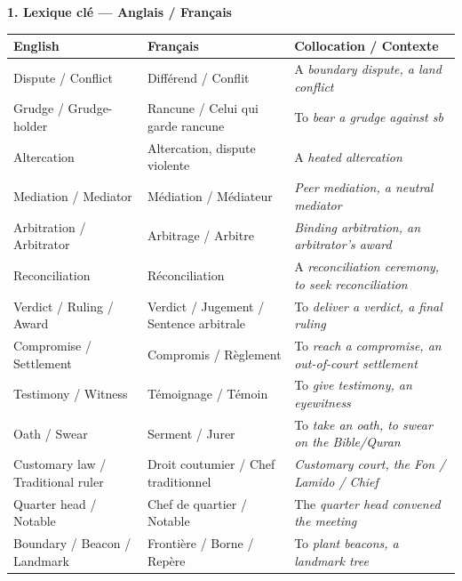 \documentclass[11pt]{article}
\newcommand{\cle}[1]{{\popxbold\color{popdark}#1}}
\newcommand{\eng}[1]{\ifmmode\text{\textit{#1}}\else\begingroup\selectlanguage{english}\itshape #1\endgroup\fi}
\begin{document}
\begin{bilan}

\textbf{1. Lexique clé — Anglais / Français}

\begin{center}
\begin{tabularx}{\linewidth}{|X|X|X|}
\hline
\rowcolor{popblueL}
\textbf{English} & \textbf{Français} & \textbf{Collocation / Contexte} \\
\hline
\cle{Dispute} / \cle{Conflict} & Différend / Conflit & A \eng{boundary dispute}, a \eng{land conflict} \\
\cle{Grudge} / \cle{Grudge-holder} & Rancune / Celui qui garde rancune & To \eng{bear a grudge against sb} \\
\cle{Altercation} & Altercation, dispute violente & A \eng{heated altercation} \\
\cle{Mediation} / \cle{Mediator} & Médiation / Médiateur & \eng{Peer mediation}, a \eng{neutral mediator} \\
\cle{Arbitration} / \cle{Arbitrator} & Arbitrage / Arbitre & \eng{Binding arbitration}, an \eng{arbitrator's award} \\
\cle{Reconciliation} & Réconciliation & A \eng{reconciliation ceremony}, to \eng{seek reconciliation} \\
\cle{Verdict} / \cle{Ruling} / \cle{Award} & Verdict / Jugement / Sentence arbitrale & To \eng{deliver a verdict}, a \eng{final ruling} \\
\cle{Compromise} / \cle{Settlement} & Compromis / Règlement & To \eng{reach a compromise}, an \eng{out-of-court settlement} \\
\cle{Testimony} / \cle{Witness} & Témoignage / Témoin & To \eng{give testimony}, an \eng{eyewitness} \\
\cle{Oath} / \cle{Swear} & Serment / Jurer & To \eng{take an oath}, to \eng{swear on the Bible/Quran} \\
\cle{Customary law} / \cle{Traditional ruler} & Droit coutumier / Chef traditionnel & \eng{Customary court}, the \eng{Fon / Lamido / Chief} \\
\cle{Quarter head} / \cle{Notable} & Chef de quartier / Notable & The \eng{quarter head} convened the meeting \\
\cle{Boundary} / \cle{Beacon} / \cle{Landmark} & Frontière / Borne / Repère & To \eng{plant beacons}, a \eng{landmark tree} \\
\hline
\end{tabularx}
\end{center}


\end{bilan}
\end{document}
